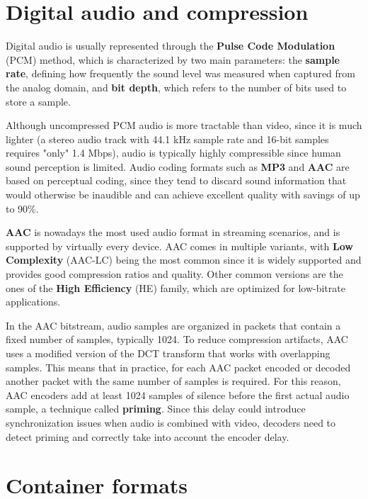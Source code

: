 \section{Digital audio and compression}
\label{sec:bg/audio}

Digital audio is usually represented through the \textbf{Pulse Code Modulation} (PCM) method, which is characterized by two main parameters: the \textbf{sample rate}, defining how frequently the sound level was measured when captured from the analog domain, and \textbf{bit depth}, which refers to the number of bits used to store a sample.

Although uncompressed PCM audio is more tractable than video, since it is much lighter (a stereo audio track with 44.1 kHz sample rate and 16-bit samples requires "only" 1.4 Mbps), audio is typically highly compressible since human sound perception is limited. Audio coding formats such as \textbf{MP3} and \textbf{AAC} are based on perceptual coding, since they tend to discard sound information that would otherwise be inaudible and can achieve excellent quality with savings of up to 90\%.\cite{aac}

\textbf{AAC} is nowadays the most used audio format in streaming scenarios, and is supported by virtually every device.\cite{bitmovin} AAC comes in multiple variants, with \textbf{Low Complexity} (AAC-LC) being the most common since it is widely supported and provides good compression ratios and quality. Other common versions are the ones of the \textbf{High Efficiency} (HE) family, which are optimized for low-bitrate applications.

In the AAC bitstream, audio samples are organized in packets that contain a fixed number of samples, typically 1024. To reduce compression artifacts, AAC uses a modified version of the DCT transform that works with overlapping samples. This means that in practice, for each AAC packet encoded or decoded another packet with the same number of samples is required. For this reason, AAC encoders add at least 1024 samples of silence before the first actual audio sample, a technique called \textbf{priming}. Since this delay could introduce synchronization issues when audio is combined with video, decoders need to detect priming and correctly take into account the encoder delay.\cite{aacpriming}

\section{Container formats}
\label{sec:bg/containers}

